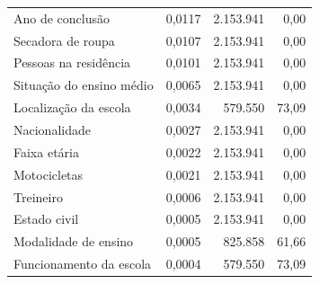\begin{tabularx}{\linewidth}{@{}Xrrr@{}}
Ano de conclusão & 0,0117 & 2.153.941 & 0,00 \\
Secadora de roupa & 0,0107 & 2.153.941 & 0,00 \\
Pessoas na residência & 0,0101 & 2.153.941 & 0,00 \\
Situação do ensino médio & 0,0065 & 2.153.941 & 0,00 \\
Localização da escola & 0,0034 & 579.550 & 73,09 \\
Nacionalidade & 0,0027 & 2.153.941 & 0,00 \\
Faixa etária & 0,0022 & 2.153.941 & 0,00 \\
Motocicletas & 0,0021 & 2.153.941 & 0,00 \\
Treineiro & 0,0006 & 2.153.941 & 0,00 \\
Estado civil & 0,0005 & 2.153.941 & 0,00 \\
Modalidade de ensino & 0,0005 & 825.858 & 61,66 \\
Funcionamento da escola & 0,0004 & 579.550 & 73,09 \\\bottomrule\end{tabularx}